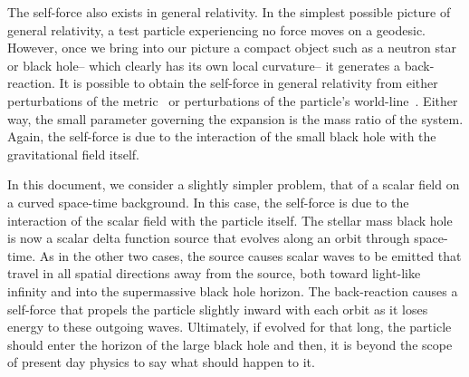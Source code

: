 The self-force also exists in general relativity. In the simplest possible picture of general relativity, a test particle experiencing no force moves on a geodesic. However, once we bring into our picture a compact object such as a neutron star or black hole-- which clearly has its own local curvature-- it generates a back-reaction. It is possible to obtain the self-force in general relativity from either perturbations of the metric~\cite{pound2ndOrderSelfForce} or perturbations of the particle's world-line~\cite{WardellSelfForceReview}. Either way, the small parameter governing the expansion is the mass ratio of the system. Again, the self-force is due to the interaction of the small black hole with the gravitational field itself.

In this document, we consider a slightly simpler problem, that of a scalar field on a curved space-time background. In this case, the self-force is due to the interaction of the scalar field with the particle itself. The stellar mass black hole is now a scalar delta function source that evolves along an orbit through space-time. As in the other two cases, the source causes scalar waves to be emitted that travel in all spatial directions away from the source, both toward light-like infinity and into the supermassive black hole horizon. The back-reaction causes a self-force that propels the particle slightly inward with each orbit as it loses energy to these outgoing waves. Ultimately, if evolved for that long, the particle should enter the horizon of the large black hole and then, it is beyond the scope of present day physics to say what should happen to it. 



